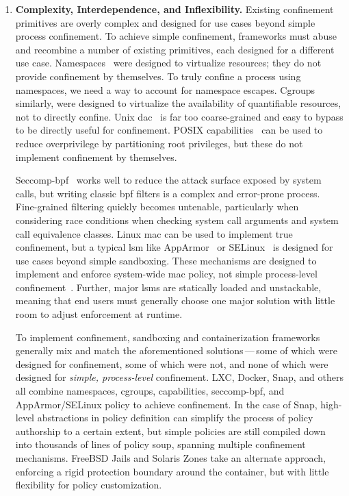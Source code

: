 \begin{enumerate}[font=\bfseries]
  \item \label{i:problem-complexity} \textbf{Complexity, Interdependence, and Inflexibility.}
    Existing confinement primitives are overly complex and designed for use cases beyond
    simple process confinement. To achieve simple confinement, frameworks must abuse and
    recombine a number of existing primitives, each designed for a different use case.
    Namespaces~\cite{biederman2006_namespaces, linux_namespaces} were designed to
    virtualize resources; they do not provide confinement by themselves. To truly confine
    a process using namespaces, we need a way to account for namespace escapes.
    Cgroups~\cite{cgroups} similarly, were designed to virtualize the availability of
    quantifiable resources, not to directly confine. Unix
    \gls{dac}~\cite{jaeger2008_os_security, van_oorschot2020_tools_jewels} is far too
    coarse-grained and easy to bypass to be directly useful for confinement. POSIX
    capabilities~\cite{posix_capabilities} can be used to reduce overprivilege by
    partitioning root privileges, but these do not implement confinement by themselves.

    Seccomp-bpf~\cite{seccomp, edge2015_seccomp} works well to reduce the attack surface
    exposed by system calls, but writing classic \gls{bpf} filters is a complex and
    error-prone process. Fine-grained filtering quickly becomes untenable, particularly
    when considering race conditions when checking system call arguments and system call
    equivalence classes.  Linux \gls{mac} can be used to implement true confinement, but
    a typical \gls{lsm} like AppArmor~\cite{cowan2000_apparmor} or
    SELinux~\cite{smalley2001_selinux} is designed for use cases beyond simple sandboxing.
    These mechanisms are designed to implement and enforce system-wide \gls{mac} policy,
    not simple process-level confinement~\cite{belair2019_leveraging}. Further, major
    \glspl{lsm} are statically loaded and unstackable, meaning that end users must
    generally choose one major solution with little room to adjust enforcement at runtime.

    To implement confinement, sandboxing and containerization frameworks generally mix and
    match the aforementioned solutions\,---\,some of which were designed for confinement,
    some of which were not, and none of which were designed for \textit{simple,
    process-level} confinement. LXC, Docker, Snap, and others all combine namespaces,
    cgroups, capabilities, seccomp-bpf, and AppArmor/SELinux policy to achieve
    confinement. In the case of Snap, high-level abstractions in policy definition can
    simplify the process of policy authorship to a certain extent, but simple policies
    are still compiled down into thousands of lines of policy soup, spanning multiple
    confinement mechanisms. FreeBSD Jails and Solaris Zones take an alternate approach,
    enforcing a rigid protection boundary around the container, but with little flexibility
    for policy customization.


\end{enumerate}
